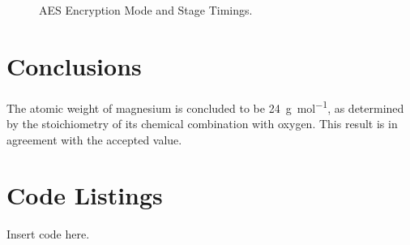 \documentclass{article}
\begin{document}
\begin{figure}
\begin{mdframed}

\end{mdframed}
\caption{AES Encryption Mode and Stage Timings.}
\label{fig:step1fd}
\end{figure}


\section{Conclusions}

The atomic weight of magnesium is concluded to be \SI{24}{\gram\per\mol}, as determined by the stoichiometry of its chemical combination with oxygen. This result is in agreement with the accepted value.


\section{Code Listings}

Insert code here.
\end{document}

